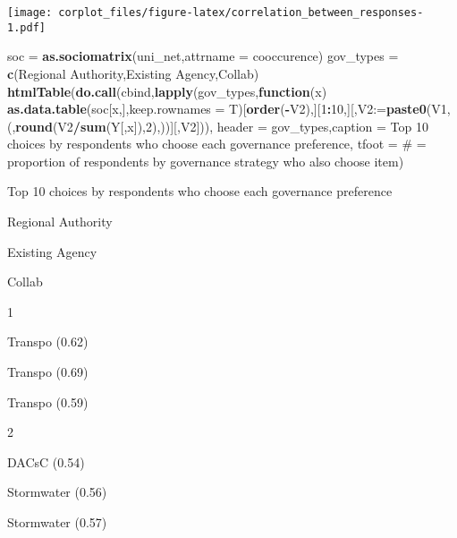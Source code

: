 \documentclass[
]{article}
\newenvironment{Shaded}{\begin{snugshade}}{\end{snugshade}}
\newcommand{\ControlFlowTok}[1]{\textcolor[rgb]{0.13,0.29,0.53}{\textbf{#1}}}
\newcommand{\DataTypeTok}[1]{\textcolor[rgb]{0.13,0.29,0.53}{#1}}
\newcommand{\DecValTok}[1]{\textcolor[rgb]{0.00,0.00,0.81}{#1}}
\newcommand{\KeywordTok}[1]{\textcolor[rgb]{0.13,0.29,0.53}{\textbf{#1}}}
\newcommand{\NormalTok}[1]{#1}
\newcommand{\OperatorTok}[1]{\textcolor[rgb]{0.81,0.36,0.00}{\textbf{#1}}}
\newcommand{\StringTok}[1]{\textcolor[rgb]{0.31,0.60,0.02}{#1}}
\begin{document}
\texttt{[image: corplot\_files/figure-latex/correlation\_between\_responses-1.pdf]}

\begin{Shaded}
\begin{Highlighting}[]
\NormalTok{soc =}\StringTok{ }\KeywordTok{as.sociomatrix}\NormalTok{(uni\_net,}\DataTypeTok{attrname =} \StringTok{\textquotesingle{}cooccurence\textquotesingle{}}\NormalTok{)}
\NormalTok{gov\_types =}\StringTok{ }\KeywordTok{c}\NormalTok{(}\StringTok{\textquotesingle{}Regional Authority\textquotesingle{}}\NormalTok{,}\StringTok{\textquotesingle{}Existing Agency\textquotesingle{}}\NormalTok{,}\StringTok{\textquotesingle{}Collab\textquotesingle{}}\NormalTok{)}
\KeywordTok{htmlTable}\NormalTok{(}\KeywordTok{do.call}\NormalTok{(cbind,}\KeywordTok{lapply}\NormalTok{(gov\_types,}\ControlFlowTok{function}\NormalTok{(x) }
\KeywordTok{as.data.table}\NormalTok{(soc[x,],}\DataTypeTok{keep.rownames =}\NormalTok{ T)[}\KeywordTok{order}\NormalTok{(}\OperatorTok{{-}}\NormalTok{V2),][}\DecValTok{1}\OperatorTok{:}\DecValTok{10}\NormalTok{,][,}\DataTypeTok{V2:=}\KeywordTok{paste0}\NormalTok{(V1,}\StringTok{\textquotesingle{} (\textquotesingle{}}\NormalTok{,}\KeywordTok{round}\NormalTok{(V2}\OperatorTok{/}\KeywordTok{sum}\NormalTok{(Y[,x]),}\DecValTok{2}\NormalTok{),}\StringTok{\textquotesingle{})\textquotesingle{}}\NormalTok{)][,}\StringTok{\textquotesingle{}V2\textquotesingle{}}\NormalTok{])),}
\DataTypeTok{header =}\NormalTok{ gov\_types,}\DataTypeTok{caption  =} \StringTok{\textquotesingle{}Top 10 choices by respondents who choose each governance preference\textquotesingle{}}\NormalTok{,}
\DataTypeTok{tfoot =} \StringTok{\textquotesingle{}\# = proportion of respondents by governance strategy who also choose item\textquotesingle{}}\NormalTok{)}
\end{Highlighting}
\end{Shaded}

Top 10 choices by respondents who choose each governance preference

Regional Authority

Existing Agency

Collab

1

Transpo (0.62)

Transpo (0.69)

Transpo (0.59)

2

DACsC (0.54)

Stormwater (0.56)

Stormwater (0.57)
\end{document}
